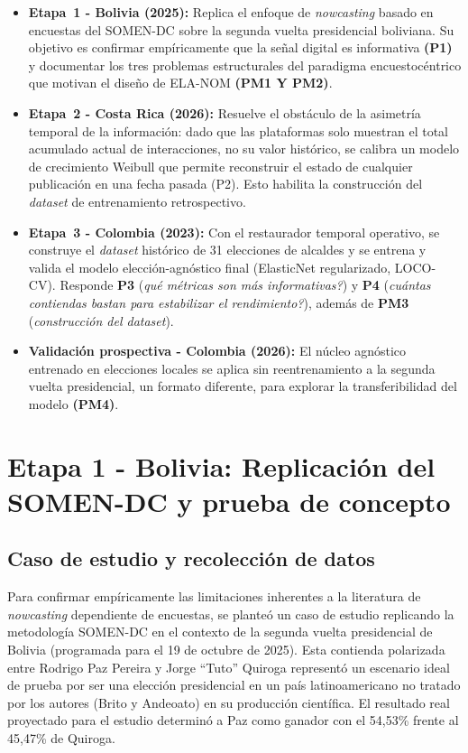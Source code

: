 \begin{itemize}
    \item \textbf{Etapa~1 - Bolivia (2025):} Replica el enfoque de \textit{nowcasting} basado en encuestas del SOMEN-DC sobre la segunda vuelta presidencial boliviana. Su objetivo es confirmar empíricamente que la señal digital es informativa \textbf{(P1)} y documentar los tres problemas estructurales del paradigma encuestocéntrico que motivan el diseño de ELA-NOM \textbf{(PM1 Y PM2)}.
    \item \textbf{Etapa~2 - Costa Rica (2026):} Resuelve el obstáculo de la asimetría temporal de la información: dado que las plataformas solo muestran el total acumulado actual de interacciones, no su valor histórico, se calibra un modelo de crecimiento Weibull que permite reconstruir el estado de cualquier publicación en una fecha pasada (P2). Esto habilita la construcción del \textit{dataset} de entrenamiento retrospectivo.
    \item \textbf{Etapa~3 - Colombia (2023):} Con el restaurador temporal operativo, se construye el \textit{dataset} histórico de 31 elecciones de alcaldes y se entrena y valida el modelo elección-agnóstico final (ElasticNet regularizado, LOCO-CV). Responde \textbf{P3} (\textit{\textquestiondown{}qué métricas son más informativas?}) y \textbf{P4} (\textit{\textquestiondown{}cuántas contiendas bastan para estabilizar el rendimiento?}), además de \textbf{PM3} (\textit{construcción del dataset}).
    \item \textbf{Validación prospectiva - Colombia (2026):} El núcleo agnóstico entrenado en elecciones locales se aplica sin reentrenamiento a la segunda vuelta presidencial, un formato diferente, para explorar la transferibilidad del modelo \textbf{(PM4)}.
\end{itemize}

\section{Etapa 1 - Bolivia: Replicación del SOMEN-DC y prueba de concepto}

\subsection{Caso de estudio y recolección de datos}

Para confirmar empíricamente las limitaciones inherentes a la literatura de \textit{nowcasting} dependiente de encuestas, se planteó un caso de estudio replicando la metodología SOMEN-DC en el contexto de la segunda vuelta presidencial de Bolivia (programada para el 19 de octubre de 2025). Esta contienda polarizada entre Rodrigo Paz Pereira y Jorge ``Tuto'' Quiroga representó un escenario ideal de prueba por ser una elección presidencial en un país latinoamericano no tratado por los autores (Brito y Andeoato) en su producción científica. El resultado real proyectado para el estudio determinó a Paz como ganador con el 54{,}53\% frente al 45{,}47\% de Quiroga.

